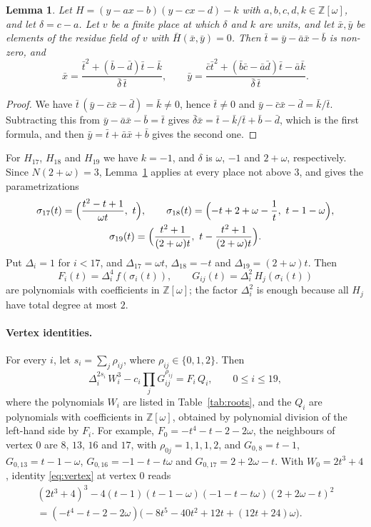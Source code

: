 \documentclass[11pt]{article}
\newtheorem{lemma}[theorem]{Lemma}
\newcommand{\Z}{\mathbb{Z}}
\begin{document}
\begin{lemma}\label{lem:conic}
Let $H=(y-ax-b)(y-cx-d)-k$ with $a,b,c,d,k\in\Z[\omega]$, and let $\delta=c-a$. Let $v$ be a finite place at which $\delta$ and $k$ are units, and let $\bar x,\bar y$ be elements of the residue field of $v$ with $\bar H(\bar x,\bar y)=0$. Then $\bar t=\bar y-\bar a\bar x-\bar b$ is non-zero, and
\[
\bar x=\frac{\bar t^2+(\bar b-\bar d)\bar t-\bar k}{\bar\delta\,\bar t},\qquad\bar y=\frac{\bar c\bar t^2+(\bar b\bar c-\bar a\bar d)\bar t-\bar a\bar k}{\bar\delta\,\bar t}.
\]
\end{lemma}

\begin{proof}
We have $\bar t\,(\bar y-\bar c\bar x-\bar d)=\bar k\neq0$, hence $\bar t\neq0$ and $\bar y-\bar c\bar x-\bar d=\bar k/\bar t$. Subtracting this from $\bar y-\bar a\bar x-\bar b=\bar t$ gives $\bar\delta\bar x=\bar t-\bar k/\bar t+\bar b-\bar d$, which is the first formula, and then $\bar y=\bar t+\bar a\bar x+\bar b$ gives the second one.
\end{proof}

For $H_{17}$, $H_{18}$ and $H_{19}$ we have $k=-1$, and $\delta$ is $\omega$, $-1$ and $2+\omega$, respectively. Since $N(2+\omega)=3$, Lemma~\ref{lem:conic} applies at every place not above $3$, and gives the parametrizations
\begin{gather*}
\sigma_{17}(t)=\Bigl(\frac{t^2-t+1}{\omega t},\ t\Bigr),\qquad
\sigma_{18}(t)=\Bigl(-t+2+\omega-\frac1t,\ t-1-\omega\Bigr),\\
\sigma_{19}(t)=\Bigl(\frac{t^2+1}{(2+\omega)t},\ t-\frac{t^2+1}{(2+\omega)t}\Bigr).
\end{gather*}
Put $\Delta_i=1$ for $i<17$, and $\Delta_{17}=\omega t$, $\Delta_{18}=-t$ and $\Delta_{19}=(2+\omega)t$. Then
\[
F_i(t)=\Delta_i^4\,f(\sigma_i(t)),\qquad G_{ij}(t)=\Delta_i^2\,H_j(\sigma_i(t))
\]
are polynomials with coefficients in $\Z[\omega]$; the factor $\Delta_i^2$ is enough because all $H_j$ have total degree at most $2$.

\paragraph{Vertex identities.} For every $i$, let $s_i=\sum_j\rho_{ij}$, where $\rho_{ij}\in\{0,1,2\}$. Then
\begin{equation}\label{eq:vertex}
\Delta_i^{2s_i}\,W_i^3-c_i\prod_{j}G_{ij}^{\rho_{ij}}=F_i\,Q_i,\qquad0\le i\le19,
\end{equation}
where the polynomials $W_i$ are listed in Table~\ref{tab:roots}, and the $Q_i$ are polynomials with coefficients in $\Z[\omega]$, obtained by polynomial division of the left-hand side by $F_i$. For example, $F_0=-t^4-t-2-2\omega$, the neighbours of vertex $0$ are $8$, $13$, $16$ and $17$, with $\rho_{0j}=1,1,1,2$, and $G_{0,8}=t-1$, $G_{0,13}=t-1-\omega$, $G_{0,16}=-1-t-t\omega$ and $G_{0,17}=2+2\omega-t$. With $W_0=2t^3+4$, identity \eqref{eq:vertex} at vertex $0$ reads
\begin{multline*}
(2t^3+4)^3-4(t-1)(t-1-\omega)(-1-t-t\omega)(2+2\omega-t)^2\\
=(-t^4-t-2-2\omega)\bigl(-8t^5-40t^2+12t+(12t+24)\omega\bigr).
\end{multline*}
\end{document}
